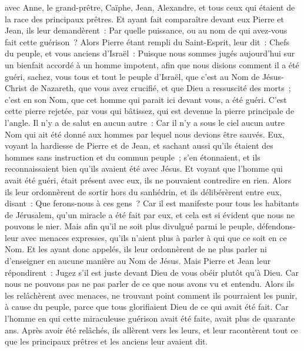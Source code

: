 \begin{multicols}{2}
avec Anne, le grand-prêtre, Caïphe, Jean, Alexandre, et tous ceux qui étaient de la race des principaux prêtres.
Et ayant fait comparaître devant eux Pierre et Jean, ils leur demandèrent~: Par quelle puissance, ou au nom de qui avez-vous fait cette guérison~?
Alors Pierre étant rempli du Saint-Esprit, leur dit~: Chefs du peuple, et vous anciens d'Israël~:
Puisque nous sommes jugés aujourd'hui sur un bienfait accordé à un homme impotent, afin que nous disions comment il a été guéri,
sachez, vous tous et tout le peuple d'Israël, que c'est au Nom de Jésus-Christ de Nazareth, que vous avez crucifié, et que Dieu a ressuscité des morts~; c'est en son Nom, que cet homme qui parait ici devant vous, a été guéri.
C'est cette pierre rejetée, par vous qui bâtissez, qui est devenue la pierre principale de l'angle.
Il n'y a de salut en aucun autre~: Car il n'y a sous le ciel aucun autre Nom qui ait été donné aux hommes par lequel nous devions être sauvés.
Eux, voyant la hardiesse de Pierre et de Jean, et sachant aussi qu'ils étaient des hommes sans instruction et du commun peuple~; s'en étonnaient, et ils reconnaissaient bien qu'ils avaient été avec Jésus.
Et voyant que l'homme qui avait été guéri, était présent avec eux, ils ne pouvaient contredire en rien.
Alors ils leur ordonnèrent de sortir hors du sanhédrin, et ils délibérèrent entre eux, disant~: Que ferons-nous à ces gens~?
Car il est manifeste pour tous les habitants de Jérusalem, qu'un miracle a été fait par eux, et cela est si évident que nous ne pouvons le nier.
Mais afin qu'il ne soit plus divulgué parmi le peuple, défendons-leur avec menaces expresses, qu'ils n'aient plus à parler à qui que ce soit en ce Nom.
Et les ayant donc appelés, ils leur ordonnèrent de ne plus parler ni d'enseigner en aucune manière au Nom de Jésus. 
Mais Pierre et Jean leur répondirent~: Jugez s'il est juste devant Dieu de vous obéir plutôt qu'à Dieu.
Car nous ne pouvons pas ne pas parler de ce que nous avons vu et entendu.
Alors ils les relâchèrent avec menaces, ne trouvant point comment ils pourraient les punir, à cause du peuple, parce que tous glorifiaient Dieu de ce qui avait été fait.
Car l'homme en qui cette miraculeuse guérison avait été faite, avait plus de quarante ans.
Après avoir été relâchés, ils allèrent vers les leurs, et leur racontèrent tout ce que les principaux prêtres et les anciens leur avaient dit.

\end{multicols}
